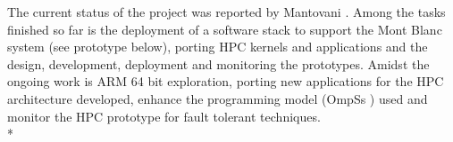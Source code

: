 
The current status of the project was reported by Mantovani \cite{m:MB-15}. Among the tasks finished so far is the deployment of a software stack to support the Mont Blanc system (see prototype below), porting HPC kernels and applications and the design, development, deployment and monitoring the prototypes. Amidst the ongoing work is ARM 64 bit exploration, porting new applications for the HPC architecture developed, enhance the programming model (OmpSs \cite{m:ompss}) used and monitor the HPC prototype for fault tolerant techniques. \\*

